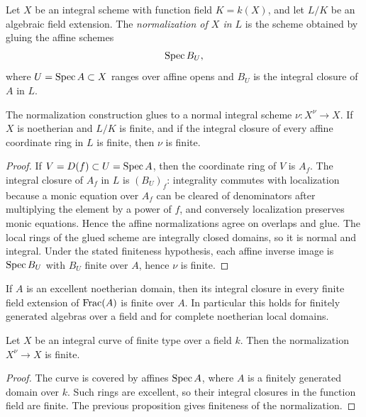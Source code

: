 \begin{definition}
Let \(X\) be an integral scheme with function field \(K=k(X)\), and let
\(L/K\) be an algebraic field extension.  The \emph{normalization of \(X\) in
\(L\)} is the scheme obtained by gluing the affine schemes
\[
    \operatorname{Spec} B_U,
\]
where \(U=\operatorname{Spec} A\subset X\) ranges over affine opens and \(B_U\) is the
integral closure of \(A\) in \(L\).
\end{definition}

\begin{proposition}
The normalization construction glues to a normal integral scheme
\(\nu:X^\nu\to X\).  If \(X\) is noetherian and \(L/K\) is finite, and if the
integral closure of every affine coordinate ring in \(L\) is finite, then
\(\nu\) is finite.
\end{proposition}

\begin{proof}
If \(V=D(f)\subset U=\operatorname{Spec} A\), then the coordinate ring of \(V\) is \(A_f\).
The integral closure of \(A_f\) in \(L\) is \((B_U)_f\): integrality commutes
with localization because a monic equation over \(A_f\) can be cleared of
denominators after multiplying the element by a power of \(f\), and conversely
localization preserves monic equations.  Hence the affine normalizations agree
on overlaps and glue.  The local rings of the glued scheme are integrally
closed domains, so it is normal and integral.  Under the stated finiteness
hypothesis, each affine inverse image is \(\operatorname{Spec} B_U\) with \(B_U\) finite over
\(A\), hence \(\nu\) is finite.
\end{proof}

\begin{fact}
If \(A\) is an excellent noetherian domain, then its integral closure in every
finite field extension of \(\operatorname{Frac}(A)\) is finite over \(A\).  In particular
this holds for finitely generated algebras over a field and for complete
noetherian local domains.
\end{fact}

\begin{corollary}
Let \(X\) be an integral curve of finite type over a field \(k\).  Then the
normalization \(X^\nu\to X\) is finite.
\end{corollary}

\begin{proof}
The curve is covered by affines \(\operatorname{Spec} A\), where \(A\) is a finitely generated
domain over \(k\).  Such rings are excellent, so their integral closures in the
function field are finite.  The previous proposition gives finiteness of the
normalization.
\end{proof}
